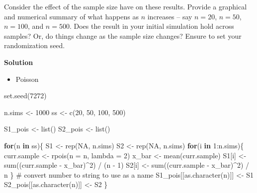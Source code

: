 \documentclass[
]{article}
\newenvironment{Shaded}{\begin{snugshade}}{\end{snugshade}}
\newcommand{\AttributeTok}[1]{\textcolor[rgb]{0.40,0.45,0.13}{#1}}
\newcommand{\CommentTok}[1]{\textcolor[rgb]{0.37,0.37,0.37}{#1}}
\newcommand{\ConstantTok}[1]{\textcolor[rgb]{0.56,0.35,0.01}{#1}}
\newcommand{\ControlFlowTok}[1]{\textcolor[rgb]{0.00,0.23,0.31}{\textbf{#1}}}
\newcommand{\DecValTok}[1]{\textcolor[rgb]{0.68,0.00,0.00}{#1}}
\newcommand{\FunctionTok}[1]{\textcolor[rgb]{0.28,0.35,0.67}{#1}}
\newcommand{\NormalTok}[1]{\textcolor[rgb]{0.00,0.23,0.31}{#1}}
\newcommand{\OtherTok}[1]{\textcolor[rgb]{0.00,0.23,0.31}{#1}}
\newcommand{\SpecialCharTok}[1]{\textcolor[rgb]{0.37,0.37,0.37}{#1}}
\providecommand{\tightlist}{%
  \setlength{\itemsep}{0pt}\setlength{\parskip}{0pt}}
\begin{document}
Consider the effect of the sample size have on these results. Provide a
graphical and numerical summary of what happens as \(n\) increases --
say \(n=20\), \(n=50\), \(n=100\), and \(n=500\). Does the result in
your initial simulation hold across samples? Or, do things change as the
sample size changes? Ensure to set your randomization seed.

\textbf{Solution}

\begin{itemize}
\tightlist
\item
  Poisson
\end{itemize}

\normalsize

\begin{Shaded}
\begin{Highlighting}[numbers=left,,]
\FunctionTok{set.seed}\NormalTok{(}\DecValTok{7272}\NormalTok{)}

\NormalTok{n.sims }\OtherTok{\textless{}{-}} \DecValTok{1000}
\NormalTok{ss }\OtherTok{\textless{}{-}} \FunctionTok{c}\NormalTok{(}\DecValTok{20}\NormalTok{, }\DecValTok{50}\NormalTok{, }\DecValTok{100}\NormalTok{, }\DecValTok{500}\NormalTok{)}

\NormalTok{S1\_pois }\OtherTok{\textless{}{-}} \FunctionTok{list}\NormalTok{()}
\NormalTok{S2\_pois }\OtherTok{\textless{}{-}} \FunctionTok{list}\NormalTok{()}

\ControlFlowTok{for}\NormalTok{(n }\ControlFlowTok{in}\NormalTok{ ss)\{}
\NormalTok{  S1 }\OtherTok{\textless{}{-}} \FunctionTok{rep}\NormalTok{(}\ConstantTok{NA}\NormalTok{, n.sims)}
\NormalTok{  S2 }\OtherTok{\textless{}{-}} \FunctionTok{rep}\NormalTok{(}\ConstantTok{NA}\NormalTok{, n.sims)}
  \ControlFlowTok{for}\NormalTok{(i }\ControlFlowTok{in} \DecValTok{1}\SpecialCharTok{:}\NormalTok{n.sims)\{}
\NormalTok{    curr.sample }\OtherTok{\textless{}{-}} \FunctionTok{rpois}\NormalTok{(}\AttributeTok{n =}\NormalTok{ n, }\AttributeTok{lambda =} \DecValTok{2}\NormalTok{)}
\NormalTok{    x\_bar }\OtherTok{\textless{}{-}} \FunctionTok{mean}\NormalTok{(curr.sample)}
\NormalTok{    S1[i] }\OtherTok{\textless{}{-}} \FunctionTok{sum}\NormalTok{((curr.sample }\SpecialCharTok{{-}}\NormalTok{ x\_bar)}\SpecialCharTok{\^{}}\DecValTok{2}\NormalTok{) }\SpecialCharTok{/}\NormalTok{ (n }\SpecialCharTok{{-}} \DecValTok{1}\NormalTok{)}
\NormalTok{    S2[i] }\OtherTok{\textless{}{-}} \FunctionTok{sum}\NormalTok{((curr.sample }\SpecialCharTok{{-}}\NormalTok{ x\_bar)}\SpecialCharTok{\^{}}\DecValTok{2}\NormalTok{) }\SpecialCharTok{/}\NormalTok{ n}
\NormalTok{  \}}
  \CommentTok{\# convert number to string to use as a name}
\NormalTok{  S1\_pois[[}\FunctionTok{as.character}\NormalTok{(n)]] }\OtherTok{\textless{}{-}}\NormalTok{ S1}
\NormalTok{  S2\_pois[[}\FunctionTok{as.character}\NormalTok{(n)]] }\OtherTok{\textless{}{-}}\NormalTok{ S2}
\NormalTok{\}}


\end{Highlighting}
\end{Shaded}
\end{document}
